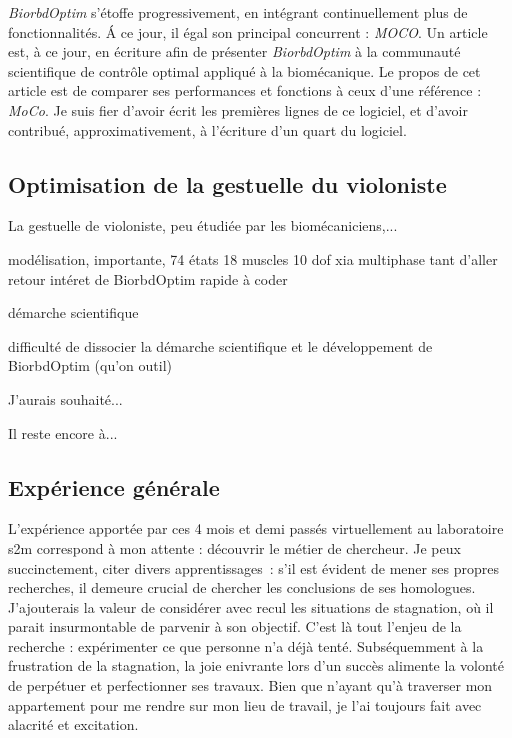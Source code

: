 \emph{BiorbdOptim} s'étoffe progressivement, en intégrant continuellement plus de fonctionnalités. \'A ce jour,  il égal son principal concurrent : \emph{MOCO}. Un article est, à ce jour, en écriture afin de présenter \emph{BiorbdOptim} à la communauté scientifique de contrôle optimal appliqué à la biomécanique. Le propos de cet article est de comparer ses performances et fonctions à ceux d'une référence : \emph{MoCo}.
Je suis fier d'avoir écrit les premières lignes de ce logiciel, et d'avoir contribué, approximativement, à l'écriture d'un quart du logiciel.


    \subsection*{Optimisation de la gestuelle du violoniste}
    
La gestuelle de violoniste, peu étudiée par les biomécaniciens,...

modélisation, importante, 74 états 18 muscles 10 dof
xia
multiphase tant d'aller retour
intéret de BiorbdOptim rapide à coder

démarche scientifique

difficulté de dissocier la démarche scientifique et le développement de BiorbdOptim (qu'on outil)

J'aurais souhaité...

Il reste encore à...

    
    \subsection*{Expérience générale}
    
L'expérience apportée par ces 4 mois et demi passés virtuellement au laboratoire s2m correspond à mon attente : découvrir le métier de chercheur. Je peux succinctement, citer divers apprentissages~: s'il est évident de mener ses propres recherches, il demeure crucial de chercher les conclusions de ses homologues. J'ajouterais la valeur de considérer avec recul les situations de stagnation, où il parait insurmontable de parvenir à son objectif. C'est là tout l'enjeu de la recherche : expérimenter ce que personne n'a déjà tenté.
Subséquemment à la frustration de la stagnation, la joie enivrante lors d'un succès alimente la volonté de perpétuer et perfectionner ses travaux. Bien que n'ayant qu'à traverser mon appartement pour me rendre sur mon lieu de travail, je l'ai toujours fait avec alacrité et excitation.

